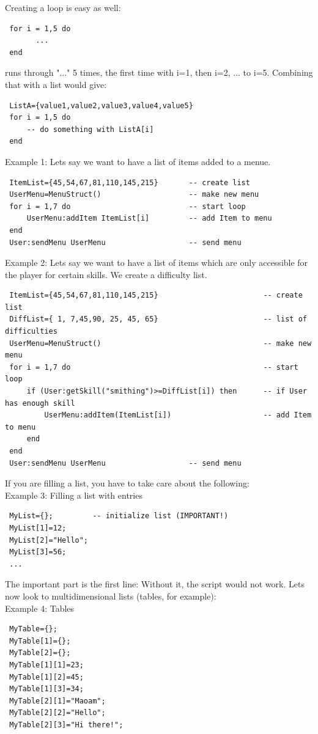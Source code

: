\documentclass[a4paper,10pt,makeidx]{scrreprt}
\begin{document}
Creating a loop is easy as well:
\begin{verbatim}
 for i = 1,5 do
       ...
 end
\end{verbatim}
runs through "..." 5 times, the first time with i=1, then i=2, ... to i=5.
Combining that with a list would give:
\begin{verbatim}
 ListA={value1,value2,value3,value4,value5}
 for i = 1,5 do
     -- do something with ListA[i]
 end
\end{verbatim}
Example 1: Lets say we want to have a list of items added to a menue.
\begin{verbatim}
 ItemList={45,54,67,81,110,145,215}       -- create list
 UserMenu=MenuStruct()                    -- make new menu
 for i = 1,7 do                           -- start loop
     UserMenu:addItem ItemList[i]         -- add Item to menu
 end
 User:sendMenu UserMenu                   -- send menu
\end{verbatim}
 Example 2: Lets say we want to have a list of items which are only accessible for the player for certain skills. We create a difficulty list.
\begin{verbatim}
 ItemList={45,54,67,81,110,145,215}                        -- create list
 DiffList={ 1, 7,45,90, 25, 45, 65}                        -- list of difficulties
 UserMenu=MenuStruct()                                     -- make new menu
 for i = 1,7 do                                            -- start loop
     if (User:getSkill("smithing")>=DiffList[i]) then      -- if User has enough skill
         UserMenu:addItem(ItemList[i])                     -- add Item to menu
     end
 end
 User:sendMenu UserMenu                   -- send menu
\end{verbatim}
If you are filling a list, you have to take care about the following:\\
Example 3: Filling a list with entries
\begin{verbatim}
 MyList={};         -- initialize list (IMPORTANT!)
 MyList[1]=12;
 MyList[2]="Hello";
 MyList[3]=56;
 ...
\end{verbatim}
The important part is the first line: Without it, the script would not work.
Lets now look to multidimensional lists (tables, for example):\\
Example 4: Tables
\begin{verbatim}
 MyTable={};
 MyTable[1]={};
 MyTable[2]={};
 MyTable[1][1]=23;
 MyTable[1][2]=45;
 MyTable[1][3]=34;
 MyTable[2][1]="Maoam";
 MyTable[2][2]="Hello";
 MyTable[2][3]="Hi there!";
\end{verbatim}
\end{document}
